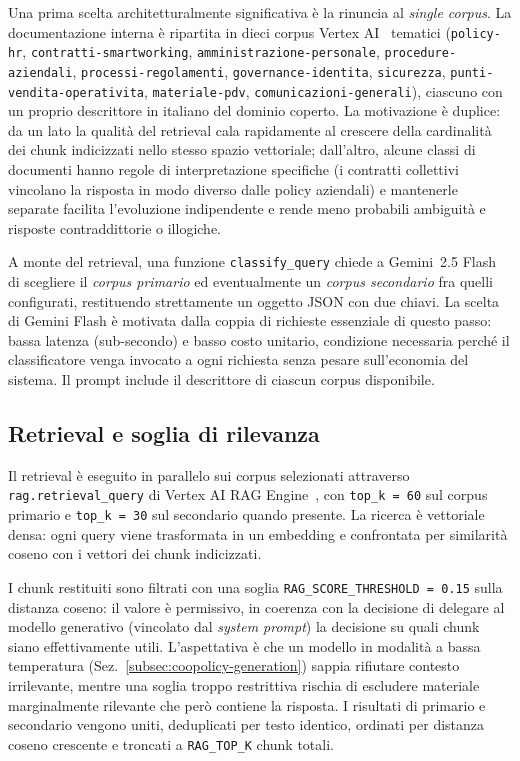 Una prima scelta architetturalmente significativa è la rinuncia al
\emph{single corpus}. La documentazione interna è ripartita in dieci corpus
Vertex AI~\cite{gcp_vertex_rag} tematici (\texttt{policy-hr},
\texttt{contratti-smartworking}, \texttt{amministrazione-personale},
\texttt{procedure-aziendali}, \texttt{processi-regolamenti},
\texttt{governance-identita}, \texttt{sicurezza},
\texttt{punti-vendita-operativita}, \texttt{materiale-pdv},
\texttt{comunicazioni-generali}), ciascuno con un proprio descrittore in
italiano del dominio coperto. La motivazione è duplice: da un lato la
qualità del retrieval cala rapidamente al crescere della cardinalità dei
chunk indicizzati nello stesso spazio vettoriale; dall'altro, alcune
classi di documenti hanno regole di interpretazione
specifiche (i contratti collettivi vincolano la risposta in modo diverso
dalle policy aziendali) e mantenerle separate facilita l'evoluzione
indipendente e rende meno probabili ambiguità e risposte contraddittorie
o illogiche.

A monte del retrieval, una funzione \texttt{classify\_query} chiede a
Gemini~2.5 Flash di scegliere il \emph{corpus primario} ed eventualmente
un \emph{corpus secondario} fra quelli configurati, restituendo
strettamente un oggetto JSON con due chiavi. La scelta di Gemini Flash è
motivata dalla coppia di richieste essenziale di questo passo: bassa
latenza (sub-secondo) e basso costo unitario, condizione necessaria
perché il classificatore venga invocato a ogni richiesta senza pesare
sull'economia del sistema. Il prompt include il descrittore di ciascun
corpus disponibile.

\subsection{Retrieval e soglia di rilevanza}
\label{subsec:coopolicy-retrieval}

Il retrieval è eseguito in parallelo sui corpus selezionati attraverso
\texttt{rag.retrieval\_query} di Vertex AI RAG Engine~\cite{gcp_vertex_rag},
con \texttt{top\_k = 60} sul corpus primario e \texttt{top\_k = 30} sul
secondario quando presente. La ricerca è vettoriale densa: ogni query
viene trasformata in un embedding e confrontata per similarità coseno
con i vettori dei chunk indicizzati.

I chunk restituiti sono filtrati con una soglia
\texttt{RAG\_SCORE\_THRESHOLD~=~0.15} sulla distanza coseno: il valore è
permissivo, in coerenza con la decisione di delegare al
modello generativo (vincolato dal \emph{system prompt}) la decisione su
quali chunk siano effettivamente utili. L'aspettativa è che un modello in
modalità a bassa temperatura (Sez.~\ref{subsec:coopolicy-generation})
sappia rifiutare contesto irrilevante, mentre una soglia troppo restrittiva
rischia di escludere materiale marginalmente rilevante che però contiene
la risposta. I risultati di primario e secondario vengono uniti,
deduplicati per testo identico, ordinati per distanza coseno crescente
e troncati a \texttt{RAG\_TOP\_K} chunk totali.


